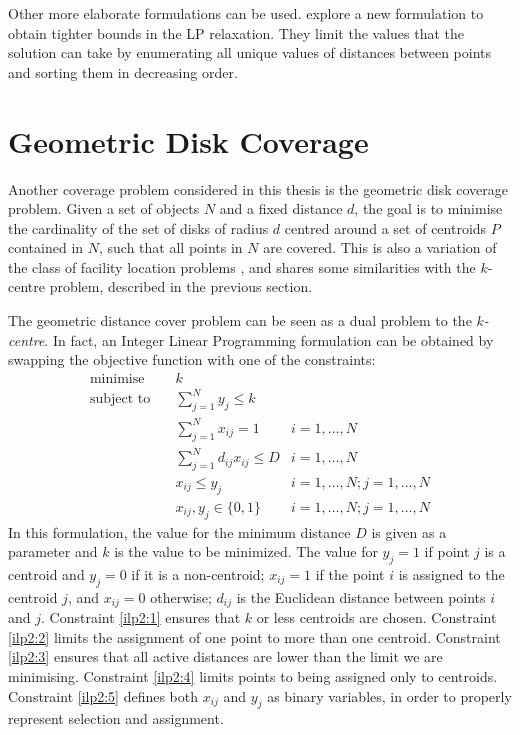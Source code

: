 Other more elaborate formulations can be used. \citet{linearprog} explore a new formulation to obtain tighter bounds in the LP relaxation. They limit the values that the solution can take by enumerating all unique values of distances between points and sorting them in decreasing order.

\section{Geometric Disk Coverage}
\label{ilp2}
Another coverage problem considered in this thesis is the geometric disk coverage problem. Given a set of objects $N$ and a fixed distance $d$, the goal is to minimise the cardinality of the set of disks of radius $d$ centred around a set of centroids $P$ contained in $N$, such that all points in $N$ are covered. This is also a variation of the class of facility location problems \cite{thisfref}, and shares some similarities with the $k$-centre problem, described in the previous section.

The geometric distance cover problem can be seen as a dual problem to the \emph{$k$-centre}. In fact, an Integer Linear Programming formulation can be obtained by swapping the objective function with one of the constraints:
\begin{align}
\text{minimise}   \quad& k							   &\\
\text{subject to} \quad
& \sum\limits_{j=1}^{N}{y_j} \leq k 
& 							\label{ilp2:1}\\
& \sum\limits_{j=1}^{N}{x_{ij}}	= 1   
& i=1,\ldots,N 				\label{ilp2:2}\\
& \sum\limits_{j=1}^{N}{d_{ij} x_{ij}} \leq D
& i=1,\ldots,N				\label{ilp2:3}\\
& x_{ij} \leq y_{j}				   
& i=1,\ldots,N;j=1,\ldots,N	\label{ilp2:4}\\
& x_{ij},y_{j} \in \{0,1\}
& i=1,\ldots,N;j=1,\ldots,N \label{ilp2:5}
\end{align}
In this formulation, the value for the minimum distance $D$ is given as a parameter and $k$ is the value to be minimized. The value for $y_j = 1$ if point $j$ is a centroid and $y_j = 0$ if it is a non-centroid;
$x_{ij} = 1$ if the point $i$ is assigned to the centroid $j$, and $x_{ij}=0$ otherwise;
$d_{ij}$ is the Euclidean distance between points $i$ and $j$.
Constraint \eqref{ilp2:1} ensures that $k$ or less centroids are chosen.
Constraint \eqref{ilp2:2} limits the assignment of one point to more than one centroid.
Constraint \eqref{ilp2:3} ensures that all active distances are lower than the limit we are minimising.
Constraint \eqref{ilp2:4} limits points to being assigned only to centroids.
Constraint \eqref{ilp2:5} defines both $x_{ij}$ and $y_j$ as binary variables, in order to properly represent selection and assignment.

